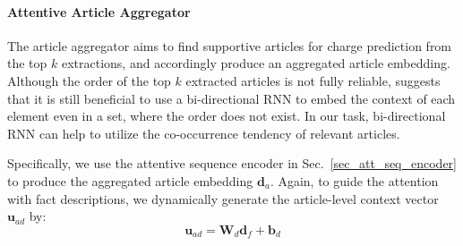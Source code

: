 \paragraph{Attentive Article Aggregator}
The article aggregator aims to find supportive articles for charge prediction from the top $k$ extractions, and accordingly produce an aggregated article embedding.
%
%
% 
Although the order of the top $k$ extracted articles is not fully reliable, \cite{vinyals2016matching} suggests that it is still beneficial to use a bi-directional RNN to embed the context of each element even in a set, where the order does not exist.
In our task, bi-directional RNN can help to utilize the co-occurrence tendency of relevant articles.

Specifically, we use the attentive sequence encoder in Sec.~\ref{sec_att_seq_encoder} 
to produce the aggregated article embedding $\mathbf{d}_a$. 
Again, to guide the attention with fact descriptions, we dynamically generate the article-level context vector $\mathbf{u}_{ad}$ by:
\begin{equation}
\mathbf{u}_{ad} = \mathbf{W}_d \mathbf{d}_f + \mathbf{b}_d
\end{equation}


